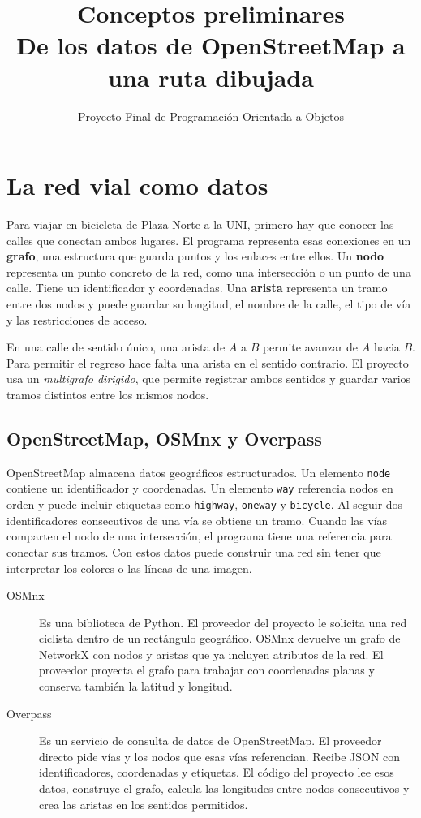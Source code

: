 \documentclass[11pt,a4paper]{article}
\title{Conceptos preliminares\\De los datos de OpenStreetMap a una ruta dibujada}
\author{Proyecto Final de Programación Orientada a Objetos}
\date{}
\begin{document}
\maketitle

\section{La red vial como datos}

Para viajar en bicicleta de Plaza Norte a la UNI, primero hay que conocer las calles que conectan ambos lugares. El programa representa esas conexiones en un \textbf{grafo}, una estructura que guarda puntos y los enlaces entre ellos. Un \textbf{nodo} representa un punto concreto de la red, como una intersección o un punto de una calle. Tiene un identificador y coordenadas. Una \textbf{arista} representa un tramo entre dos nodos y puede guardar su longitud, el nombre de la calle, el tipo de vía y las restricciones de acceso.

En una calle de sentido único, una arista de \(A\) a \(B\) permite avanzar de \(A\) hacia \(B\). Para permitir el regreso hace falta una arista en el sentido contrario. El proyecto usa un \emph{multigrafo dirigido}, que permite registrar ambos sentidos y guardar varios tramos distintos entre los mismos nodos.

\subsection{OpenStreetMap, OSMnx y Overpass}

OpenStreetMap almacena datos geográficos estructurados. Un elemento \texttt{node} contiene un identificador y coordenadas. Un elemento \texttt{way} referencia nodos en orden y puede incluir etiquetas como \texttt{highway}, \texttt{oneway} y \texttt{bicycle}. Al seguir dos identificadores consecutivos de una vía se obtiene un tramo. Cuando las vías comparten el nodo de una intersección, el programa tiene una referencia para conectar sus tramos. Con estos datos puede construir una red sin tener que interpretar los colores o las líneas de una imagen.

\begin{description}
\item[OSMnx] Es una biblioteca de Python. El proveedor del proyecto le solicita una red ciclista dentro de un rectángulo geográfico. OSMnx devuelve un grafo de NetworkX con nodos y aristas que ya incluyen atributos de la red. El proveedor proyecta el grafo para trabajar con coordenadas planas y conserva también la latitud y longitud.
\item[Overpass] Es un servicio de consulta de datos de OpenStreetMap. El proveedor directo pide vías y los nodos que esas vías referencian. Recibe JSON con identificadores, coordenadas y etiquetas. El código del proyecto lee esos datos, construye el grafo, calcula las longitudes entre nodos consecutivos y crea las aristas en los sentidos permitidos.
\end{description}
\end{document}

